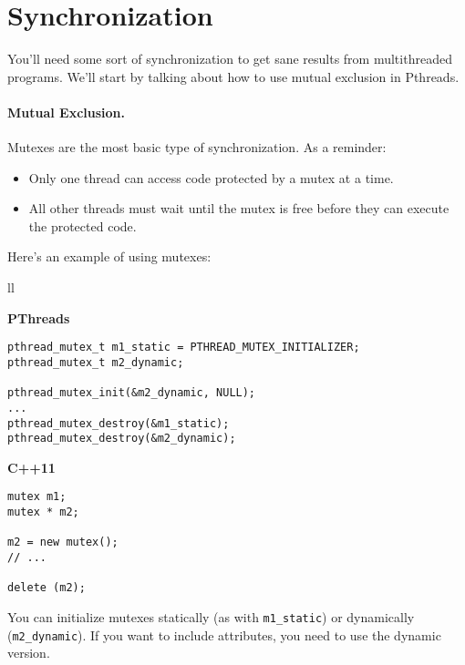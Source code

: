 \section*{Synchronization}
You'll need some sort of synchronization to get sane results from
multithreaded programs. We'll start by talking about how to use
mutual exclusion in Pthreads.


\paragraph{Mutual Exclusion.} Mutexes are the most basic type of synchronization.
As a reminder:
    \begin{itemize}
    \item Only one thread can access code protected by a mutex at a time.
    \item All other threads must wait until the mutex is free before they can
      execute the protected code.
    \end{itemize}

    Here's an example of using mutexes:
    
    \begin{tabular}{ll}
      \begin{minipage}{.65\textwidth}
        {\bf PThreads}
  \begin{verbatim}
pthread_mutex_t m1_static = PTHREAD_MUTEX_INITIALIZER;
pthread_mutex_t m2_dynamic;

pthread_mutex_init(&m2_dynamic, NULL);
...
pthread_mutex_destroy(&m1_static);
pthread_mutex_destroy(&m2_dynamic);
  \end{verbatim}
      \end{minipage}
      \begin{minipage}{.35\textwidth}
        {\bf C++11}
  \begin{verbatim}
mutex m1;
mutex * m2;

m2 = new mutex();
// ...

delete (m2);
  \end{verbatim}
      \end{minipage}
    \end{tabular}

You can initialize mutexes statically (as with {\tt m1\_static}) or
dynamically ({\tt m2\_dynamic}). If you want to include attributes,
you need to use the dynamic version.

